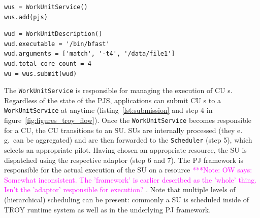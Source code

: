 \documentclass[conference,final]{IEEEtran}
\newcommand{\note}[1]{ {\textcolor{magenta} { ***Note: #1 }}}
\newcommand{\note}[1]{}
\newcommand{\cu}{CU\xspace}
\begin{document}
\noindent\begin{minipage}{0.47 \textwidth}
\begin{lstlisting}[caption={\textbf{WorkUnitService Creation:} Instantiation of 
	a \texttt{WorkUnitService} using a reference to the 
	\texttt{PilotJobService}.}, 
	label={lst:wus_creation}]
wus = WorkUnitService()
wus.add(pjs)
\end{lstlisting}
\end{minipage}

\noindent\begin{minipage}{0.47 \textwidth}
\begin{lstlisting}[caption={\textbf{WorkUnit Submission:} Instantiation and 
	submission of a \texttt{WorkUnitDescription}.}, label={lst:submission}] 
wud = WorkUnitDescription()
wud.executable = '/bin/bfast'
wud.arguments = ['match', '-t4', '/data/file1']
wud.total_core_count = 4
wu = wus.submit(wud)
\end{lstlisting}
\end{minipage}


The \texttt{WorkUnitService} is responsible for managing the execution of \cu s.
Regardless of the state of the PJS, applications can submit \cu s to a
\texttt{WorkUnitService} at anytime (listing~\ref{lst:submission} and step 4 in
figure~\ref{fig:figures_troy_flow}). Once the \texttt{WorkUnitService} becomes
responsible for a \cu, the \cu  transitions to an SU. SUs are internally processed
(they e.\,g.\ can be aggregated) and are then forwarded to the
\texttt{Scheduler} (step 5), which selects an appropriate pilot. Having chosen
an appropriate resource, the SU is dispatched using the respective adaptor (step
6 and 7). The PJ framework is responsible for the actual execution of the SU on
a resource
\note{OW says: Somewhat inconsistent. The 'framework' is earlier described as 
the 'whole' thing. Isn't the 'adaptor' responsible for execution?}. 
Note that multiple levels of (hierarchical) scheduling can be
present: commonly a SU is scheduled inside of TROY runtime system as well as in
the underlying PJ framework.
\end{document}
